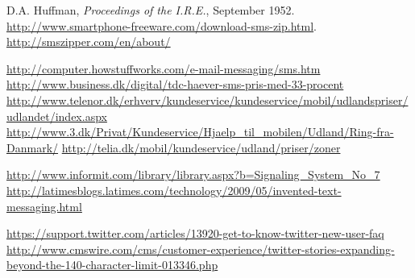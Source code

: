  D.A. Huffman, {\it Proceedings of the I.R.E.}, September 1952.
 {\url{http://www.smartphone-freeware.com/download-sms-zip.html}}.
 {\url{http://smszipper.com/en/about/}}

 {\url{http://computer.howstuffworks.com/e-mail-messaging/sms.htm}}
 {\url{http://www.business.dk/digital/tdc-haever-sms-pris-med-33-procent}}
 {\url{http://www.telenor.dk/erhverv/kundeservice/kundeservice/mobil/udlandspriser/udlandet/index.aspx}}
 {\url{http://www.3.dk/Privat/Kundeservice/Hjaelp_til_mobilen/Udland/Ring-fra-Danmark/}}
 {\url{http://telia.dk/mobil/kundeservice/udland/priser/zoner}}

 {\url{http://www.informit.com/library/library.aspx?b=Signaling_System_No_7}}
 {\url{http://latimesblogs.latimes.com/technology/2009/05/invented-text-messaging.html}}

 {\url{https://support.twitter.com/articles/13920-get-to-know-twitter-new-user-faq}}
 {\url{http://www.cmswire.com/cms/customer-experience/twitter-stories-expanding-beyond-the-140-character-limit-013346.php}}


